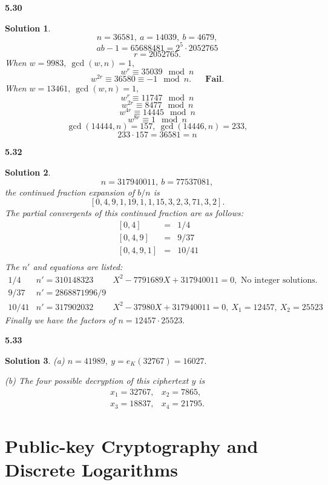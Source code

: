 \documentclass[12pt,a4paper]{article}
\theoremstyle{solution}
\newtheorem*{sol}{Solution}
\begin{document}
\textbf{5.30}

\begin{sol}
$$n=36581,~a=14039,~b=4679,$$
$$ab-1=65688481=2^5\cdot 2052765$$
$$r=2052765.$$
When $w=9983,~\gcd(w,n)=1,$
$$w^r\equiv 35039 \mod {n}$$
$$w^{2r}\equiv 36580\equiv-1 \mod {n}.\textbf{~~~~~Fail.}$$
When $w=13461,~\gcd(w,n)=1,$
$$w^r\equiv 11747 \mod {n}$$
$$w^{2r}\equiv 8477 \mod {n}$$
$$w^{4r}\equiv 14445 \mod {n}$$
$$w^{8r}\equiv 1 \mod {n}$$
$$\gcd(14444,n)=157,~\gcd(14446,n)=233,$$
$$233 \cdot 157=36581=n$$
\end{sol}

\textbf{5.32}

\begin{sol}
$$n=317940011,~b=77537081,$$
the continued fraction expansion of $b/n$ is
$$[0, 4, 9, 1, 19, 1, 1, 15, 3, 2, 3, 71, 3, 2].$$
The partial convergents of this continued fraction are as follows:
$$
\begin{array}{rcl}
~[0,4]  &=& 1/4\\
~[0, 4, 9] &=&9/37\\
~[0, 4, 9, 1] &=& 10/41\\
\end{array}
$$
The $n'$ and equations are listed:
$$
\begin{array}{rll}
1/4 & n'=310148323 & X^2 - 7791689X + 317940011 = 0,\mbox{ No integer solutions.}\\
9/37 & n'=2868871996/9& \\
10/41 & n'=317902032& X^2 - 37980X + 317940011 = 0,~X_1=12457,~X_2=25523
\end{array}
$$
Finally we have the factors of $n=12457\cdot25523.$
\end{sol}


\textbf{5.33}

\begin{sol}
{\em (a)} $n=41989,~y=e_K(32767)=16027.$

{\em (b)} The four possible decryption of this ciphertext $y$ is
$$
\begin{array}{cc}
x_1=32767, &x_2=7865, \\
x_3=18837, &x_4=21795.
\end{array}
$$
\end{sol}

\section{Public-key Cryptography and Discrete Logarithms}
\end{document}
